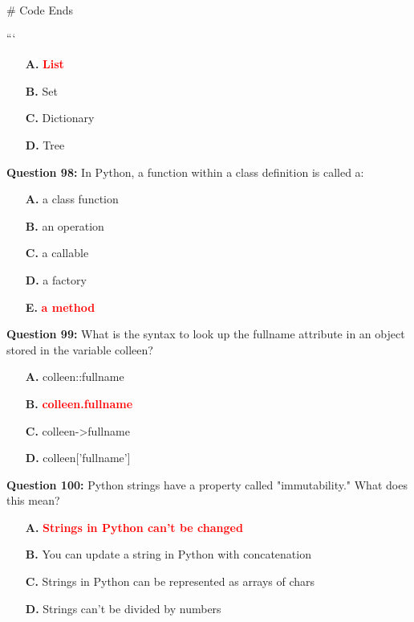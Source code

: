 \documentclass[12pt,a4paper]{article}
\begin{document}
\newline
# Code Ends\newline

\newline
```

\begin{itemize}
    \item[\textbf{A.}] \textcolor{red}{\textbf{List}}
    \item[\textbf{B.}] Set
    \item[\textbf{C.}] Dictionary
    \item[\textbf{D.}] Tree
\end{itemize}

\vspace{0.5cm}

\textbf{Question 98:} In Python, a function within a class definition is called a:

\begin{itemize}
    \item[\textbf{A.}] a class function
    \item[\textbf{B.}] an operation
    \item[\textbf{C.}] a callable
    \item[\textbf{D.}] a factory
    \item[\textbf{E.}] \textcolor{red}{\textbf{a method}}
\end{itemize}

\vspace{0.5cm}

\textbf{Question 99:} What is the syntax to look up the fullname attribute in an object stored in the variable colleen?

\begin{itemize}
    \item[\textbf{A.}] colleen::fullname
    \item[\textbf{B.}] \textcolor{red}{\textbf{colleen.fullname}}
    \item[\textbf{C.}] colleen->fullname
    \item[\textbf{D.}] colleen['fullname']
\end{itemize}

\vspace{0.5cm}

\textbf{Question 100:} Python strings have a property called "immutability." What does this mean?

\begin{itemize}
    \item[\textbf{A.}] \textcolor{red}{\textbf{Strings in Python can't be changed}}
    \item[\textbf{B.}] You can update a string in Python with concatenation
    \item[\textbf{C.}] Strings in Python can be represented as arrays of chars
    \item[\textbf{D.}] Strings can't be divided by numbers
\end{itemize}
\end{document}
